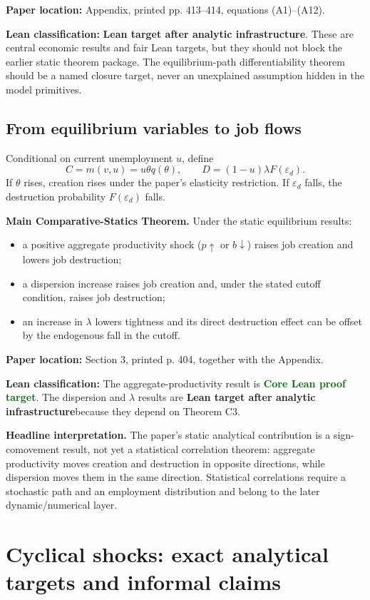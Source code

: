 \documentclass[11pt]{article}
\newcommand{\epsd}{\varepsilon_d}
\newcommand{\paperloc}[1]{\textbf{Paper location:} #1}
\newcommand{\leanclass}[1]{\textbf{Lean classification:} #1}
\newcommand{\core}{\textcolor{darkGreen}{\textbf{Core Lean proof target}}}
\newcommand{\infra}{\textcolor{darkAmber}{\textbf{Lean target after analytic infrastructure}}}
\newcommand{\statusbox}[2]{\vspace{2pt}\noindent\colorbox{#1}{\parbox{0.955\linewidth}{\small #2}}\vspace{2pt}}
\newcommand{\resultname}[1]{\medskip\noindent\textbf{#1.}}
\begin{document}
\paperloc{Appendix, printed pp. 413--414, equations (A1)--(A12).}

\leanclass{\infra.}
These are central economic results and fair Lean targets, but they should not block the earlier static theorem package. The equilibrium-path differentiability theorem should be a named closure target, never an unexplained assumption hidden in the model primitives.

\subsection{From equilibrium variables to job flows}

Conditional on current unemployment $u$, define
\[
 C=m(v,u)=u\theta q(\theta),
 \qquad
 D=(1-u)\lambda F(\epsd).
\]
If $\theta$ rises, creation rises under the paper's elasticity restriction. If $\epsd$ falls, the destruction probability $F(\epsd)$ falls.

\resultname{Main Comparative-Statics Theorem}
Under the static equilibrium results:
\begin{itemize}
\item a positive aggregate productivity shock ($p\uparrow$ or $b\downarrow$) raises job creation and lowers job destruction;
\item a dispersion increase raises job creation and, under the stated cutoff condition, raises job destruction;
\item an increase in $\lambda$ lowers tightness and its direct destruction effect can be offset by the endogenous fall in the cutoff.
\end{itemize}

\paperloc{Section 3, printed p. 404, together with the Appendix.}

\leanclass{The aggregate-productivity result is \core. The dispersion and $\lambda$ results are \infra because they depend on Theorem C3.}

\statusbox{paleBlue}{\textbf{Headline interpretation.} The paper's static analytical contribution is a sign-comovement result, not yet a statistical correlation theorem: aggregate productivity moves creation and destruction in opposite directions, while dispersion moves them in the same direction. Statistical correlations require a stochastic path and an employment distribution and belong to the later dynamic/numerical layer.}

\newpage
\section{Cyclical shocks: exact analytical targets and informal claims}
\end{document}
